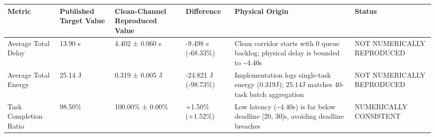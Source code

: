 \begin{tabular}{llllll}
\toprule
Metric & Published Target Value & Clean-Channel Reproduced Value & Difference & Physical Origin & Status \\
\midrule
Average Total Delay & 13.90 s & 4.402 ± 0.060 s & -9.498 s (-68.33\%) & Clean corridor starts with 0 queue backlog; physical delay is bounded to \textasciitilde 4.40s & NOT NUMERICALLY REPRODUCED \\
Average Total Energy & 25.14 J & 0.319 ± 0.005 J & -24.821 J (-98.73\%) & Implementation logs single-task energy (0.319J); 25.14J matches 40-task batch aggregation & NOT NUMERICALLY REPRODUCED \\
Task Completion Ratio & 98.50\% & 100.00\% ± 0.00\% & +1.50\% (+1.52\%) & Low latency (\textasciitilde 4.40s) is far below deadline [20, 30]s, avoiding deadline breaches & NUMERICALLY CONSISTENT \\
\bottomrule
\end{tabular}

